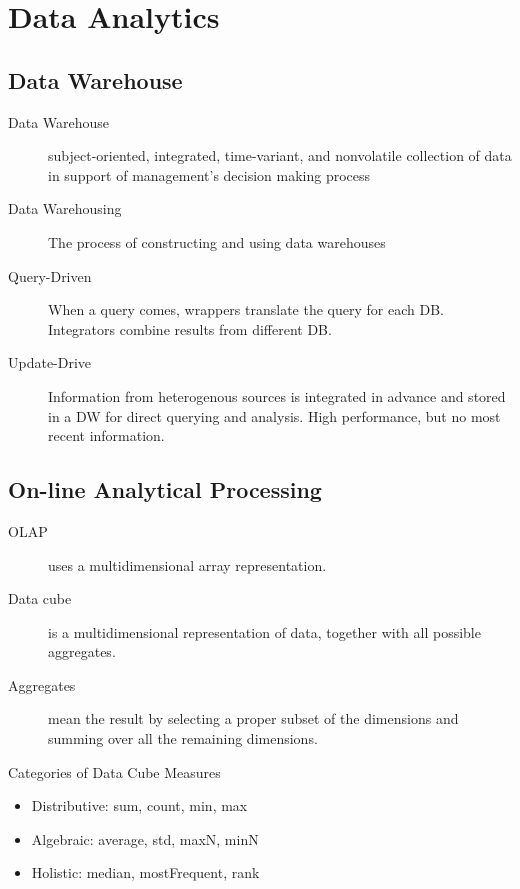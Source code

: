 \chapter{Data Analytics} 
\section{Data Warehouse} 
\begin{description}
\item[Data Warehouse] subject-oriented, integrated, time-variant, and nonvolatile collection of data in support of management's decision making process
\item[Data Warehousing] The process of constructing and using data warehouses
\item[Query-Driven] When a query comes, wrappers translate the query for each DB. Integrators combine results from different DB.
\item[Update-Drive] Information from heterogenous sources is integrated in advance and stored in a DW for direct querying and analysis. High performance, but no most recent information. 
\end{description}

\section{On-line Analytical Processing}
\begin{description}
\item[OLAP] uses a multidimensional array representation.
\item[Data cube] is a multidimensional representation of data, together with all possible aggregates.
\item[Aggregates] mean the result by selecting a proper subset of the dimensions and summing over all the remaining dimensions.
\end{description} \par \noindent
Categories of Data Cube Measures
\begin{itemize}
\item Distributive: sum, count, min, max
\item Algebraic: average, std, maxN, minN
\item Holistic: median, mostFrequent, rank
\end{itemize}